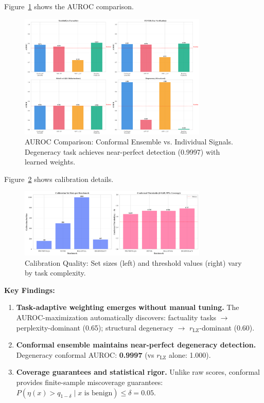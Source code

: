 \documentclass[10pt]{article}
\begin{document}
Figure~\ref{fig:conformal-performance} shows the AUROC comparison.

\begin{figure}[h]
\centering
\includegraphics[width=0.8\textwidth]{../../figures/auroc_comparison_conformal.png}
\caption{AUROC Comparison: Conformal Ensemble vs. Individual Signals. Degeneracy task achieves near-perfect detection (0.9997) with learned weights.}
\label{fig:conformal-performance}
\end{figure}

Figure~\ref{fig:calibration-quality} shows calibration details.

\begin{figure}[h]
\centering
\includegraphics[width=0.8\textwidth]{../../figures/calibration_quality.png}
\caption{Calibration Quality: Set sizes (left) and threshold values (right) vary by task complexity.}
\label{fig:calibration-quality}
\end{figure}

\textbf{Key Findings:}
\begin{enumerate}
\item \textbf{Task-adaptive weighting emerges without manual tuning.} The AUROC-maximization automatically discovers: factuality tasks $\rightarrow$ perplexity-dominant (0.65); structural degeneracy $\rightarrow$ $r_{\text{LZ}}$-dominant (0.60).
\item \textbf{Conformal ensemble maintains near-perfect degeneracy detection.} Degeneracy conformal AUROC: \textbf{0.9997} (vs $r_{\text{LZ}}$ alone: 1.000).
\item \textbf{Coverage guarantees and statistical rigor.} Unlike raw scores, conformal provides finite-sample miscoverage guarantees: $P(\eta(x) > q_{1-\delta} \mid x \text{ is benign}) \le \delta = 0.05$.
\end{enumerate}
\end{document}
